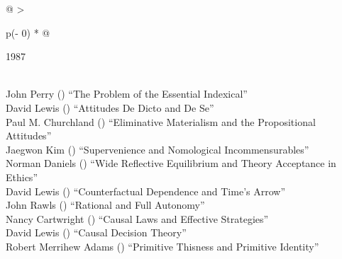 \documentclass[
  10pt,
  letterpaper,
  DIV=11,
  numbers=noendperiod,
  twoside]{scrartcl}
\begin{document}
\begin{longtable}[]{@{}
  >{\raggedright\arraybackslash}p{(\columnwidth - 0\tabcolsep) * }@{}}

\caption{\label{tbl-top-ten-1978}Most cited articles published less than
ten years ago as of 1987.}

\tabularnewline

\toprule\noalign{}
\begin{minipage}[b]{\linewidth}\raggedright
1987
\end{minipage} \\
\midrule\noalign{}
\endhead
\bottomrule\noalign{}
\endlastfoot
John Perry
()
``The Problem of the Essential Indexical'' \\
David Lewis
()
``Attitudes De Dicto and De Se'' \\
Paul M. Churchland
()
``Eliminative Materialism and the Propositional Attitudes'' \\
Jaegwon Kim
()
``Supervenience and Nomological Incommensurables'' \\
Norman Daniels
()
``Wide Reflective Equilibrium and Theory Acceptance in Ethics'' \\
David Lewis
()
``Counterfactual Dependence and Time's Arrow'' \\
John Rawls
()
``Rational and Full Autonomy'' \\
Nancy Cartwright
()
``Causal Laws and Effective Strategies'' \\
David Lewis
()
``Causal Decision Theory'' \\
Robert Merrihew Adams
()
``Primitive Thisness and Primitive Identity'' \\

\end{longtable}
\end{document}
